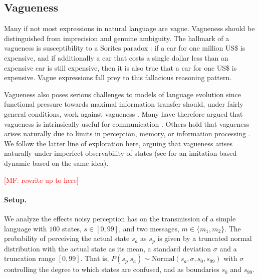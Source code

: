 \documentclass[10pt,a4paper]{article}
\newcommand{\mf}[1]{\textcolor{Red}{[MF: #1]}}
\begin{document}

\subsection{Vagueness}

Many if not most expressions in natural language are vague. Vagueness should be distinguished
from imprecision and genuine ambiguity. The hallmark of a vagueness is susceptibility to a
Sorites paradox \citep[e.g.][]{Williamson1994:Vagueness}: if a car for one million US\$ is
expensive, and if additionally a car that costs a single dollar less than an expensive car is still expensive,
then it is also true that a car for one US\$ is expensive. Vague expressions fall prey to this fallacious reasoning pattern.

Vagueness also poses serious challenges to models of language evolution since functional
pressure towards maximal information transfer should, under fairly general conditions, work
against vagueness \citep{Lipman2009:Why-is-Language}. Many have therefore argued
that vagueness is intrinsically useful for communication
\citep[e.g.][]{Deemter2009:Utility-and-Lan,Jaegherde-JaegherRooijvan-Rooij2010:Strategic-Vague,BlumeBoard2013:Intentional-Vag}. Others
hold that vagueness arises naturally due to limits in perception, memory, or information
processing
\citep[e.g.][]{FrankeJager2010:Vagueness-Signa,LassiterGoodman2015:Adjectival-vagu,OConnor2013:The-Evolution-o}. We
follow the latter line of exploration here, arguing that vagueness arises naturally under
imperfect observability of states (see \cite{franke+correia:toappear} for an imitation-based
dynamic based on the same idea).

\mf{rewrite up to here}

\paragraph{Setup.}  We analyze the effects noisy perception has on the transmission of a simple language with $100$
states, $s \in [0,99]$, and two messages, $m \in \{m_1,m_2\}$. The probability of perceiving the
actual state $s_a$ as $s_p$ is given by a truncated normal distribution with the actual state as its mean, 
a standard deviation $\sigma$ and a truncation range $[0,99]$. That is, $P(s_p | s_a) \sim \text{Normal}(s_{a},\sigma,s_{0},s_{99})$
with $\sigma$ controlling the degree to which states are confused, and as boundaries $s_{0}$ and $s_{99}$.
\end{document}
